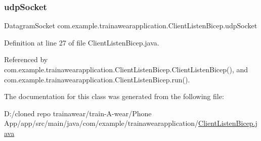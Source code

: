 \subsubsection{\texorpdfstring{udpSocket}{udpSocket}}
{\footnotesize\ttfamily Datagram\+Socket com.\+example.\+trainawearapplication.\+Client\+Listen\+Bicep.\+udp\+Socket\hspace{0.3cm}{\ttfamily [private]}}



Definition at line 27 of file Client\+Listen\+Bicep.\+java.



Referenced by com.\+example.\+trainawearapplication.\+Client\+Listen\+Bicep.\+Client\+Listen\+Bicep(), and com.\+example.\+trainawearapplication.\+Client\+Listen\+Bicep.\+run().



The documentation for this class was generated from the following file\+:\begin{DoxyCompactItemize}
\item 
D\+:/cloned repo trainawear/train-\/\+A-\/wear/\+Phone App/app/src/main/java/com/example/trainawearapplication/\mbox{\hyperlink{_client_listen_bicep_8java}{Client\+Listen\+Bicep.\+java}}\end{DoxyCompactItemize}
